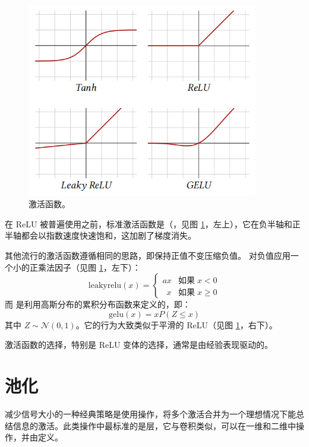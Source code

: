  \begin{figure}
    \centering
    \includegraphics[width=0.9\textwidth]{fig/fig4.5.png}
    \caption[激活函数]{激活函数。}
    \label{fig4.5}
\end{figure}

在 ReLU 被普遍使用之前，标准激活函数是（，见图 \ref{fig4.5}，左上），它在负半轴和正半轴都会以指数速度快速饱和，这加剧了梯度消失。

其他流行的激活函数遵循相同的思路，即保持正值不变压缩负值。 \citep{relu_hybrid_icml2013_final} 对负值应用一个小的正乘法因子（见图 \ref{fig4.5}，左下）：
$$
\text{leakyrelu}(x) = \begin{cases}
    ax &\text{如果}\; x < 0 \\
    \enspace x &\text{如果}\; x \ge 0
 \end{cases}
 $$
 而  \citep{arxiv-1606.08415} 是利用高斯分布的累积分布函数来定义的，即：
 \[\text{gelu}(x) = xP(Z \le x)\]
 其中 $Z \sim \mathcal{N} (0,1)$。它的行为大致类似于平滑的 ReLU（见图 \ref{fig4.5}，右下）。

 激活函数的选择，特别是 ReLU 变体的选择，通常是由经验表现驱动的。

\section{池化}\label{sec4.4}

减少信号大小的一种经典策略是使用操作，将多个激活合并为一个理想情况下能总结信息的激活。此类操作中最标准的是层，它与卷积类似，可以在一维和二维中操作，并由定义。

